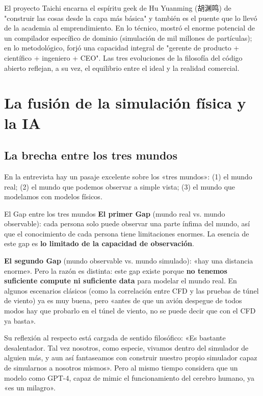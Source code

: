 \documentclass[a4paper]{article}
\begin{document}
El proyecto Taichi encarna el espíritu geek de Hu Yuanming (胡渊鸣) de "construir las cosas desde la capa más básica" y también es el puente que lo llevó de la academia al emprendimiento. En lo técnico, mostró el enorme potencial de un compilador específico de dominio (simulación de mil millones de partículas); en lo metodológico, forjó una capacidad integral de "gerente de producto + científico + ingeniero + CEO". Las tres evoluciones de la filosofía del código abierto reflejan, a su vez, el equilibrio entre el ideal y la realidad comercial.
\section{La fusión de la simulación física y la IA}

\subsection{La brecha entre los tres mundos}

En la entrevista hay un pasaje excelente sobre los «tres mundos»: (1) el mundo real; (2) el mundo que podemos observar a simple vista; (3) el mundo que modelamos con modelos físicos.

\begin{importantbox}{El Gap entre los tres mundos}
\textbf{El primer Gap} (mundo real vs. mundo observable): cada persona solo puede observar una parte ínfima del mundo, así que el conocimiento de cada persona tiene limitaciones enormes. La esencia de este gap es \textbf{lo limitado de la capacidad de observación}.

\textbf{El segundo Gap} (mundo observable vs. mundo simulado): «hay una distancia enorme». Pero la razón es distinta: este gap existe porque \textbf{no tenemos suficiente compute ni suficiente data} para modelar el mundo real. En algunos escenarios clásicos (como la correlación entre CFD y las pruebas de túnel de viento) ya es muy buena, pero «antes de que un avión despegue de todos modos hay que probarlo en el túnel de viento, no se puede decir que con el CFD ya basta».
\end{importantbox}

Su reflexión al respecto está cargada de sentido filosófico: «Es bastante desalentador. Tal vez nosotros, como especie, vivamos dentro del simulador de alguien más, y aun así fantaseamos con construir nuestro propio simulador capaz de simularnos a nosotros mismos». Pero al mismo tiempo considera que un modelo como GPT-4, capaz de mimic el funcionamiento del cerebro humano, ya «es un milagro».
\end{document}
